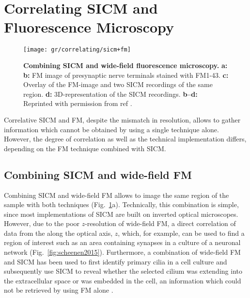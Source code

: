 \section{Correlating SICM and Fluorescence Microscopy}
\label{sec:correlating-sicm-and-fm}

\begin{figure}
  \texttt{[image: gr/correlating/sicm+fm]}
  \caption{%
    \textbf{Combining SICM and wide-field fluorescence microscopy.}
    \textbf{a:}
    \textbf{b:} FM image of presynaptic nerve terminals stained with
    FM1-43. \textbf{c:} Overlay of the FM-image and two SICM recordings of the
    same region. \textbf{d:} 3D-representation of the SICM recordings.
    \textbf{b--d:} Reprinted with permission from ref \cite{Scheenen2015}.
  }
  \label{fig:sicm+fm}
\end{figure}

Correlative SICM and FM, despite the mismatch in resolution, allows to gather
information which cannot be obtained by using a single technique
alone. However, the degree of correlation as well as the technical
implementation differs, depending on the FM
technique combined with SICM.


\subsection{Combining SICM and wide-field FM}
\label{sec:SICM+widefield}
Combining SICM and wide-field FM allows to image the same region of
the sample with both techniques (Fig.~\ref{fig:sicm+fm}a). Technically, this
combination is simple, since most implementations of SICM are built on
inverted optical microscopes. However, due to the
poor $z$-resolution of wide-field FM, a direct correlation of data from the
along the optical axis, $z$, which, for example, can be used to find a region
of interest such as an area containing synapses in a culture of a neuronal
network \cite{Novak2013,Scheenen2015}
(Fig.~\ref{fig:scheenen2015}). Furthermore, a combination of wide-field FM and
SICM has been used to first identify primary cilia in a cell culture and
subsequently use SICM to reveal whether the selected cilium was extending into
the extracellular space or was embedded in the cell, an information which
could not be retrieved by using FM alone \cite{Zhou2018}.

